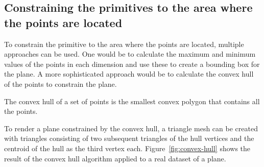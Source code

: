 \subsection{Constraining the primitives to the area where the points are located}
To constrain the primitive to the area where the points are located, multiple approaches can be used.
One would be to calculate the maximum and minimum values of the points in each dimension and use these to create a bounding box for the plane.
A more sophisticated approach would be to calculate the convex hull of the points to constrain the plane.

The convex hull of a set of points is the smallest convex polygon that contains all the points. %

To render a plane constrained by the convex hull,
a triangle mesh can be created with triangles consisting of two subsequent triangles of the hull vertices and the centroid of the hull as the third vertex each.
Figure~\ref{fig:convex-hull} shows the result of the convex hull algorithm applied to a real dataset of a plane.

